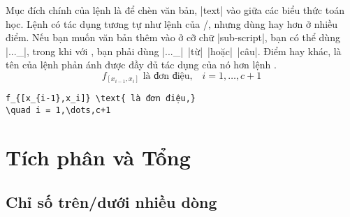 \documentclass[11pt,leqno,titlepage,openany,oneside]{amsldoc}[1999/12/13]
\begin{document}
Mục đích chính của lệnh  là để chèn văn bản, |text| vào giữa
các biểu thức toán học. Lệnh có tác dụng tương tự như lệnh 
của \latex/, nhưng dùng  hay hơn ở nhiều điểm.
Nếu bạn muốn văn bản thêm vào ở cỡ chữ |sub-script|, bạn có thể dùng
|..._{}|, trong khi với , bạn phải dùng
|..._{\mbox{\scriptsize| |từ| |hoặc| |câu}}|. Điểm hay khác, là tên của
lệnh  phản ánh được đầy đủ tác dụng của nó hơn lệnh .
\begin{equation}
f_{[x_{i-1},x_i]} \text{ là đơn điệu,}
\quad i = 1,\dots,c+1
\end{equation}
\begin{verbatim}
f_{[x_{i-1},x_i]} \text{ là đơn điệu,}
\quad i = 1,\dots,c+1
\end{verbatim}

\chapter{Tích phân và Tổng}

\section{Chỉ số trên/dưới nhiều dòng}
\end{document}
